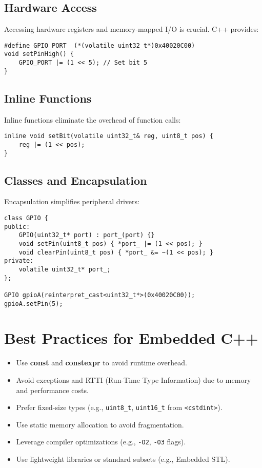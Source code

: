 \subsection{Hardware Access}
Accessing hardware registers and memory-mapped I/O is crucial. C++ provides:
\begin{verbatim}
#define GPIO_PORT  (*(volatile uint32_t*)0x40020C00)
void setPinHigh() {
    GPIO_PORT |= (1 << 5); // Set bit 5
}
\end{verbatim}

\subsection{Inline Functions}
Inline functions eliminate the overhead of function calls:
\begin{verbatim}
inline void setBit(volatile uint32_t& reg, uint8_t pos) {
    reg |= (1 << pos);
}
\end{verbatim}

\subsection{Classes and Encapsulation}
Encapsulation simplifies peripheral drivers:
\begin{verbatim}
class GPIO {
public:
    GPIO(uint32_t* port) : port_(port) {}
    void setPin(uint8_t pos) { *port_ |= (1 << pos); }
    void clearPin(uint8_t pos) { *port_ &= ~(1 << pos); }
private:
    volatile uint32_t* port_;
};

GPIO gpioA(reinterpret_cast<uint32_t*>(0x40020C00));
gpioA.setPin(5);
\end{verbatim}

\section{Best Practices for Embedded C++}
\begin{itemize}
    \item Use \textbf{const} and \textbf{constexpr} to avoid runtime overhead.
    \item Avoid exceptions and RTTI (Run-Time Type Information) due to memory and performance costs.
    \item Prefer fixed-size types (e.g., \texttt{uint8\_t}, \texttt{uint16\_t} from \texttt{<cstdint>}).
    \item Use static memory allocation to avoid fragmentation.
    \item Leverage compiler optimizations (e.g., \texttt{-O2}, \texttt{-O3} flags).
    \item Use lightweight libraries or standard subsets (e.g., Embedded STL).
\end{itemize}

